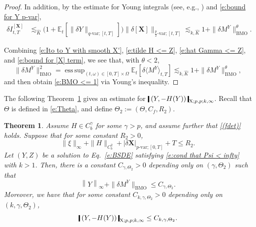 \documentclass[11pt,reqno]{amsart}
\newtheorem{theorem}[lemma]{Theorem}
\DeclareMathOperator*{\esssup}{ess\,sup}
\numberwithin{equation}{section}
\def\E{\mathbb E}
\newcommand{\shortthickbar}{%
  \vcenter{\hbox{\rule{1.8pt}{2.2ex}}}%
}
\newcommand{\thicknm}[1]{%
  \mathopen{\shortthickbar}%
  \mkern4mu #1 \mkern4mu%
  \mathclose{\shortthickbar}%
}
\begin{document}
\begin{proof}
In addition, by the estimate for Young integrals (see, e.g., \cite[Theorem~5]{diehl2017young}) and \eqref{e:bound for Y p-var}, 
\begin{equation}\label{e:bound for [X] term}
\begin{aligned}
\delta 
I^{[\mathbf X]}_{t,T}
&\lesssim_{\hat K} \big(1 + \E_{t}[\|\delta Y\|_{q\text{-var};[t,T]}] \big) \|\delta [\mathbf X]\|_{\frac{p}{2}\text{-var};[t,T]} \lesssim_{k,\hat K} 1 + \|\delta M^{Y}\|^{\theta}_{\mathrm{BMO}}.
\end{aligned}
\end{equation}

Combining \eqref{e:Ito to Y with smooth X'}, \eqref{e:tilde H <= Z}, \eqref{e:hat Gamma <= Z}, and \eqref{e:bound for [X] term}, 
we see that, with $\theta < 2$,
\begin{equation*}
\|\delta M^{Y}\|^2_{\mathrm{BMO}}  = \esssup_{(t,\omega)\in[0,T]\times\Omega} \E_{t}\left[\delta \langle M^{Y} \rangle_{t,T}\right] \lesssim_{k,\hat K}  1 + \|\delta M^{Y}\|^{\theta}
_{\mathrm{BMO}},
\end{equation*}
and then obtain \eqref{e:BMO <= 1} via
Young's inequality.
\end{proof}

The following Theorem~\ref{thm:BMO bound} gives an estimate for $\thicknm{(Y,-H(Y))}_{\mathrm X;p,p;k,\infty}$. Recall that $\Theta$ is defined in \eqref{e:Theta}, and define $\Theta_2 := (\Theta, C_{f}, R_2)$. 

\begin{theorem}\label{thm:BMO bound} 
Assume $H\in C^{\gamma}_b$ for some $\gamma > p$, and assume further that  \ref{(fdet)} holds.
Suppose that for some constant $R_2 > 0$,
\begin{equation*}
\|\xi\|_{\infty} + \|H\|_{C^{2}_b} + |\delta \mathbf X |_{p\text{-}\mathrm{var};[0,T]} + T \le R_2.
\end{equation*}
Let $(Y,Z)$ be a solution to Eq.~\eqref{e:BSDE} satisfying \eqref{e:cond that Psi < infty} with $k > 1$. 
Then, there is a constant $C_{\gamma,\Theta_2} > 0$ depending only on $(\gamma,\Theta_2)$ such that  
\begin{equation}\label{e:rough BSDE bound}
\left\|Y\right\|_{\infty} + \|\delta M^{Y}\|_{\mathrm{BMO}} \le C_{\gamma,\Theta_2}.
\end{equation}
Moreover, we have that for some constant $C_{k,\gamma,\Theta_2} > 0$ depending only on $(k,\gamma,\Theta_2)$, 
\begin{equation}\label{e:bound (Y,-H(Y))}
\thicknm{(Y,-H(Y))}_{\mathrm X;p,p;k,\infty} \le C_{k,\gamma,\Theta_2}.
\end{equation}
\end{theorem}
\end{document}

